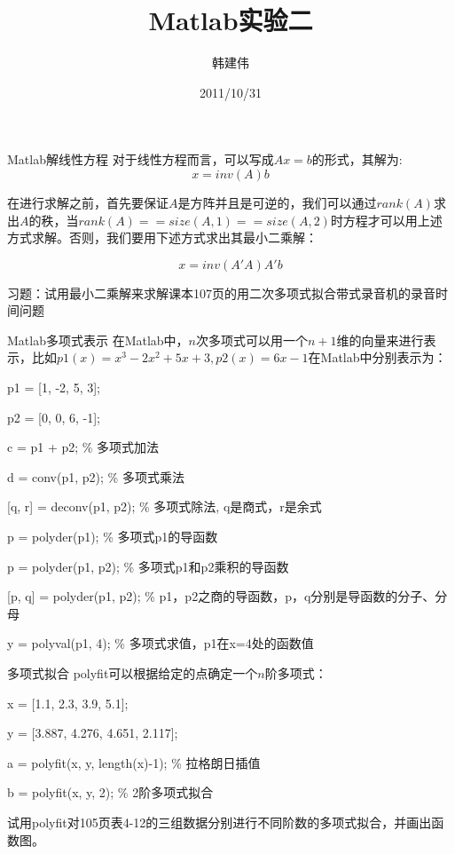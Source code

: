 \documentclass[mathserif, table]{beamer}
\title{Matlab实验二}
\author{韩建伟}
\institute{
  浙江工商大学信息学院\\
  \texttt{hanjianwei@mail.zjgsu.edu.cn}
}
\date{2011/10/31}
\begin{document}
\begin{frame}[plain]
  \titlepage{}
\end{frame}

\begin{frame}{Matlab解线性方程}
  对于线性方程而言，可以写成$Ax=b$的形式，其解为:
  \[
  x = inv(A)b
  \]
  
  在进行求解之前，首先要保证$A$是方阵并且是可逆的，我们可以通过$rank(A)$求出$A$的秩，当$rank(A) == size(A,1) == size(A,2)$时方程才可以用上述方式求解。否则，我们要用下述方式求出其最小二乘解：

  \[
  x = inv(A'A)A'b
  \]

  习题：试用最小二乘解来求解课本107页的用二次多项式拟合带式录音机的录音时间问题

\end{frame}

\begin{frame}{Matlab多项式表示}
  在Matlab中，$n$次多项式可以用一个$n+1$维的向量来进行表示，比如$p1(x) = x^3-2x^2+5x+3, p2(x)=6x-1$在Matlab中分别表示为：

  \begin{block}{}
    p1 = [1, -2, 5, 3];

    p2 = [0, 0, 6, -1];

    c = p1 + p2; \% 多项式加法

    d = conv(p1, p2); \% 多项式乘法

    [q, r] = deconv(p1, p2); \% 多项式除法, q是商式，r是余式

    p = polyder(p1); \% 多项式p1的导函数

    p = polyder(p1, p2); \% 多项式p1和p2乘积的导函数

    [p, q] = polyder(p1, p2); \% p1，p2之商的导函数，p，q分别是导函数的分子、分母

    y = polyval(p1, 4); \% 多项式求值，p1在x=4处的函数值
  \end{block}
  
\end{frame}

\begin{frame}{多项式拟合}
  polyfit可以根据给定的点确定一个$n$阶多项式：

  \begin{block}{}
    x = [1.1, 2.3, 3.9, 5.1]; 

    y = [3.887, 4.276, 4.651, 2.117];

    a = polyfit(x, y, length(x)-1);  \% 拉格朗日插值

    b  = polyfit(x, y, 2);  \% 2阶多项式拟合
  \end{block}
  
  试用polyfit对105页表4-12的三组数据分别进行不同阶数的多项式拟合，并画出函数图。

\end{frame}
\end{document}
